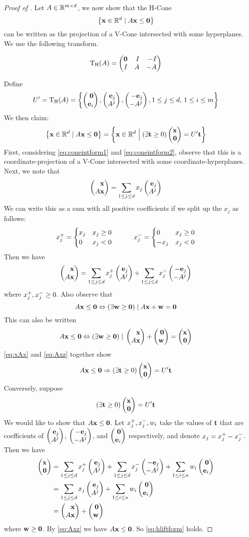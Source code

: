 \begin{proof}[Proof of ]
	Let $A \in \mathbb{R}^{{m}\times d}$, we now show that the H-Cone
	\[\left\{\mathbf{x} \in \mathbb{R}^d \;|\; A\mathbf{x} \leq \mathbf{0}\right\}\]
	can be written as the projection of a V-Cone intersected with some hyperplanes.  We use the following transform.
  \begin{Transform}\label{hconelift_transform}
  \[\HLift(A) = \pmb \0 & I & -I \\ I & A & -A \pme \]
  \end{Transform}
  Define 
  \[U' = \HLift(A) =  \set{\zei, \eAj, \neAj, 1 \leq j \leq d,\, 1 \leq i \leq m}\]
	We then claim:
	\begin{equation}\label{eq:hliftform}
		\set{\xv \st A\x \leq \0} = \set{\xv \St (\exists \t \geq 0) \xz = U'\t}
	\end{equation}
	First, considering \eqref{eq:coneintform1} and \eqref{eq:coneintform2}, observe that this is a coordinate-projection of a V-Cone intersected with some coordinate-hyperplanes.
	Next, we note that
	\[ \xAx = \jsum x_j \eAj \]
	We can write this as a sum with all positive coefficients if we split up the $x_j$ as follows:
	\[
		x_j^+ = \begin{cases} x_j & x_j \geq 0 \\ 0 & x_j < 0 \end{cases} \quad\quad\quad
		x_j^- = \begin{cases} 0 & x_j \geq 0 \\ -x_j & x_j < 0 \end{cases}
	\]
	Then we have
	\begin{equation} \label{eq:xAx}
		\xAx = \jsum \xjp \eAj + \jsum \xjm \neAj
	\end{equation}
	where $x_j^+, x_j^- \geq 0$.  Also observe that
	\[ A\mathbf{x} \leq \mathbf{0} \Leftrightarrow (\exists \mathbf{w} \geq \mathbf{0}) \;|\; A\mathbf{x} + \mathbf{w} = \mathbf{0} \]
	This can also be written
	\begin{equation} \label{eq:Axz}
		A\x \leq \0 \Leftrightarrow (\exists \w \geq \0) \st \xAx + \zw = \xz
	\end{equation}
	\eqref{eq:xAx} and \eqref{eq:Axz} together show
	\[ A\x \leq \0 \Rightarrow (\exists \t \geq 0) \xz = U'\t \]
	Conversely, suppose
	\[ (\exists \t \geq 0) \xz = U'\t \]
	We would like to show that $A\mathbf{x} \leq \mathbf{0}$.  Let $x_j^+,x_j^-,w_i$ take the values of $\mathbf{t}$ that are coefficients of $\eAj$, $\neAj$, and $\zei$ respectively, and denote $x_j = x_j^+ - x_j^-$.  Then we have
	\begin{align*}
		\xz & = \jsum \xjp \eAj + \jsum \xjm \neAj + \isum w_i\zei \\
		    & = \jsum x_j \eAj + \isum w_i\zei                     \\
		    & = \xAx + \zw
	\end{align*}
	where $\mathbf{w} \geq \mathbf{0}$.  By \eqref{eq:Axz} we have $A\mathbf{x} \leq \mathbf{0}$.  So \eqref{eq:hliftform} holds.
\end{proof}

